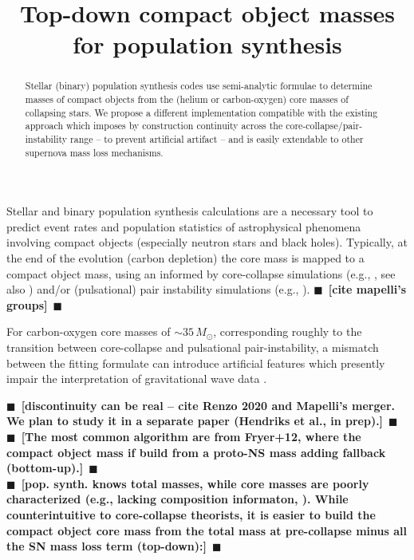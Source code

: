 \documentclass[twocolumn]{aastex63}
\newcommand{\todo}[1]{{\large $\blacksquare$~\textbf{\color{red}[#1]}}~$\blacksquare$}
\begin{document}
\title{Top-down compact object masses for population synthesis}


\begin{abstract}
  Stellar (binary) population synthesis codes use semi-analytic
  formulae to determine masses of compact objects from the (helium or
  carbon-oxygen) core masses of collapsing stars. We propose a
  different implementation compatible with the existing approach which
  imposes by construction continuity across the
  core-collapse/pair-instability range -- to prevent artificial
  artifact -- and is easily extendable to other supernova mass loss
  mechanisms.
\end{abstract}

\section*{}

Stellar and binary population synthesis calculations are a necessary
tool to predict event rates and population statistics of astrophysical
phenomena involving compact objects (especially neutron stars and
black holes). Typically, at the end of the evolution (carbon
depletion) the core mass is mapped to a compact object mass, using an
informed by core-collapse simulations (e.g., \citealt{fryer:12,
  spera:15, mandel:20, couch:20}, see also \citealt{zapartas:21, patton:21}) and/or (pulsational) pair instability simulations
(e.g., \citealt{belczynski:16, woosley:17, stevenson:19, marchant:19, farmer:19}). \todo{cite
  mapelli's groups}

For carbon-oxygen core masses of $\sim{}35\,M_\odot$, corresponding
roughly to the transition between core-collapse and pulsational
pair-instability, a mismatch between the fitting formulate can
introduce artificial features which presently impair the
interpretation of gravitational wave data \citep[see e.g. the
corresponding feature in Fig.~5 of][]{vanson:21}.

\todo{discontinuity can be real -- cite Renzo 2020 and Mapelli's
  merger. We plan to study it in a separate paper (Hendriks et al., in
  prep).}\\

\todo{The most common algorithm are from Fryer+12, where the compact
  object mass if build from a proto-NS mass adding fallback (bottom-up).}\\
\todo{pop. synth. knows total masses, while core masses are poorly
  characterized (e.g., lacking composition informaton,
  \citealt{patton:20}). While counterintuitive to core-collapse
  theorists, it is easier to build the compact object core mass from
  the total mass at pre-collapse minus all the SN mass loss term
  (top-down):}\\
\end{document}
